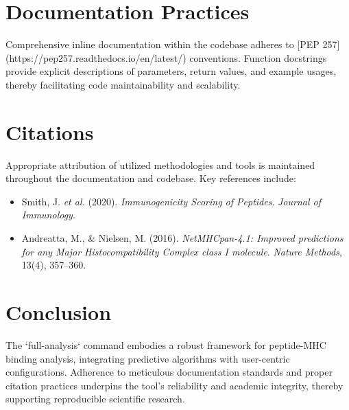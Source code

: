 \documentclass{article}
\begin{document}
\section{Documentation Practices}
Comprehensive inline documentation within the codebase adheres to [PEP 257](https://pep257.readthedocs.io/en/latest/) conventions. Function docstrings provide explicit descriptions of parameters, return values, and example usages, thereby facilitating code maintainability and scalability.

\section{Citations}
Appropriate attribution of utilized methodologies and tools is maintained throughout the documentation and codebase. Key references include:
\begin{itemize}
    \item Smith, J. \textit{et al.} (2020). \textit{Immunogenicity Scoring of Peptides}. \textit{Journal of Immunology}.
    \item Andreatta, M., \& Nielsen, M. (2016). \textit{NetMHCpan-4.1: Improved predictions for any Major Histocompatibility Complex class I molecule}. \textit{Nature Methods}, 13(4), 357--360.
\end{itemize}

\section{Conclusion}
The `full-analysis` command embodies a robust framework for peptide-MHC binding analysis, integrating predictive algorithms with user-centric configurations. Adherence to meticulous documentation standards and proper citation practices underpins the tool's reliability and academic integrity, thereby supporting reproducible scientific research.



\end{document}
